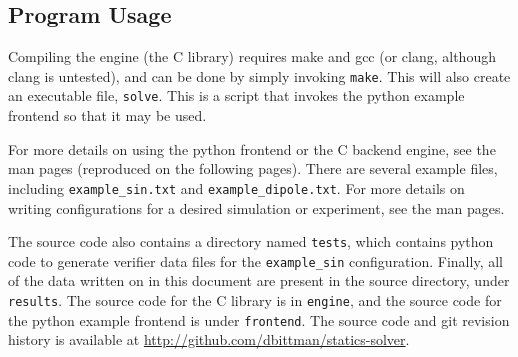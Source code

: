 \documentclass[12pt]{article}
\begin{document}
\clearpage
\begin{appendices}
\section{Program Usage}

Compiling the engine (the C library) requires make and gcc (or clang, although clang is untested), and can
be done by simply invoking \texttt{make}. This will also create an executable file, \texttt{solve}. This
is a script that invokes the python example frontend so that it may be used.

For more details on using the python frontend or the C backend engine, see the man pages (reproduced on the
following pages). There are several example files, including \texttt{example\_sin.txt} and \texttt{example\_dipole.txt}.
For more details on writing configurations for a desired simulation or experiment, see the man pages.

The source code also contains a directory named \texttt{tests}, which contains python code to generate verifier data
files for the \texttt{example\_sin} configuration. Finally, all of the data written on in this document are present
in the source directory, under \texttt{results}. The source code for the C library is in \texttt{engine}, and the
source code for the python example frontend is under \texttt{frontend}. The source code and git revision history
is available at \url{http://github.com/dbittman/statics-solver}.

	\begin{singlespacing}


	\end{singlespacing}
\clearpage






\end{appendices}

\clearpage



\end{document}
